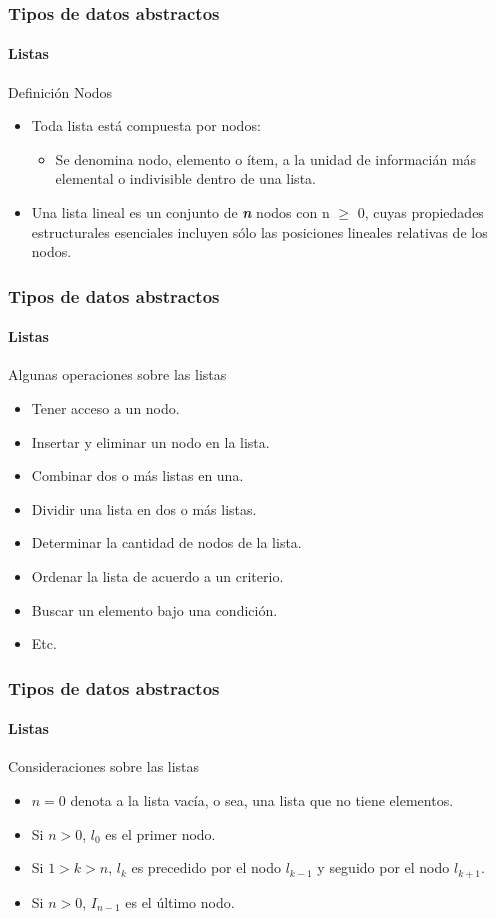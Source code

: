 \documentclass{beamer}
\begin{document}
		\begin{frame}
			\frametitle{Tipos de datos abstractos}
			\framesubtitle{Listas}

			\begin{block}{Definici\'on Nodos}
				\begin{itemize}
					\item Toda lista est\'a compuesta por nodos:
					\begin{itemize}
						\item Se denomina nodo, elemento o \'item, a la unidad de informaci\'an m\'as elemental o indivisible dentro de una lista.
					\end{itemize}
					\item Una lista lineal es un conjunto de {\em \textbf{n}} nodos con n $\geq$ 0, cuyas propiedades estructurales esenciales incluyen s\'olo las posiciones lineales relativas de los nodos.
				\end{itemize}
			\end{block}
		\end{frame}

		\begin{frame}
			\frametitle{Tipos de datos abstractos}
			\framesubtitle{Listas}

			\begin{block}{Algunas operaciones sobre las listas}
				\begin{itemize}
					\item Tener acceso a un nodo.
					\item Insertar y eliminar un nodo en la lista.
					\item Combinar dos o m\'as listas en una.
					\item Dividir una lista en dos o m\'as listas.
					\item Determinar la cantidad de nodos de la lista.
					\item Ordenar la lista de acuerdo a un criterio.
					\item Buscar un elemento bajo una condici\'on.
					\item Etc.
				\end{itemize}
			\end{block}
		\end{frame}

		\begin{frame}
			\frametitle{Tipos de datos abstractos}
			\framesubtitle{Listas}

			\begin{block}{Consideraciones sobre las listas}
				\begin{itemize}
					\item $n = 0$ denota a la lista vac\'ia, o sea, una lista que no tiene elementos.
					\item Si $n > 0$, $l_{0}$ es el primer nodo.
					\item Si $1 > k > n$, $l_{k}$ es precedido por el nodo $l_{k-1}$ y seguido por el nodo $l_{k+1}$.
					\item Si $n > 0$, $I_{n-1}$ es el \'ultimo nodo.
				\end{itemize}
			\end{block}
		\end{frame}
\end{document}
